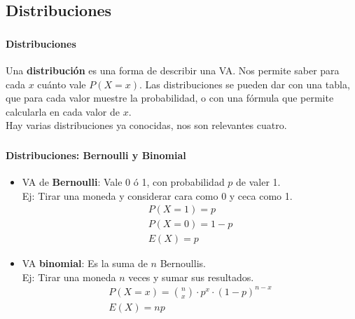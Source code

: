 \documentclass[../main.tex]{subfiles}
\begin{document}
\subsection{Distribuciones}

\begin{frame}
  \frametitle{\SECTIONA}
  \framesubtitle{Distribuciones}

  Una \textbf{distribución} es una forma de describir una VA. Nos permite saber para cada \(x\) cuánto vale \(P(X = x)\). Las distribuciones se pueden dar con una tabla, que para cada valor muestre la probabilidad, o con una fórmula que permite calcularla en cada valor de \(x\). \pause \\
  Hay varias distribuciones ya conocidas, nos son relevantes cuatro.
\end{frame}

\begin{frame}
  \frametitle{\SECTIONA}
  \framesubtitle{Distribuciones: Bernoulli y Binomial}

  \begin{itemize}
    \item VA de \textbf{Bernoulli}: Vale 0 ó 1, con probabilidad \(p\) de valer 1. \\
      Ej: Tirar una moneda y considerar cara como 0 y ceca como 1.
      \begin{gather*}
        P(X = 1) = p \\
        P(X = 0) = 1 - p \\
        E(X) = p
      \end{gather*}
    \item<2-> VA \textbf{binomial}: Es la suma de \(n\) Bernoullis. \\
      Ej: Tirar una moneda \(n\) veces y sumar sus resultados.
      \begin{gather*}
        P(X = x) = \binom{n}{x} \cdot p^{x} \cdot (1 - p)^{n - x} \\
        E(X) = np
      \end{gather*}
  \end{itemize}
\end{frame}
\end{document}
